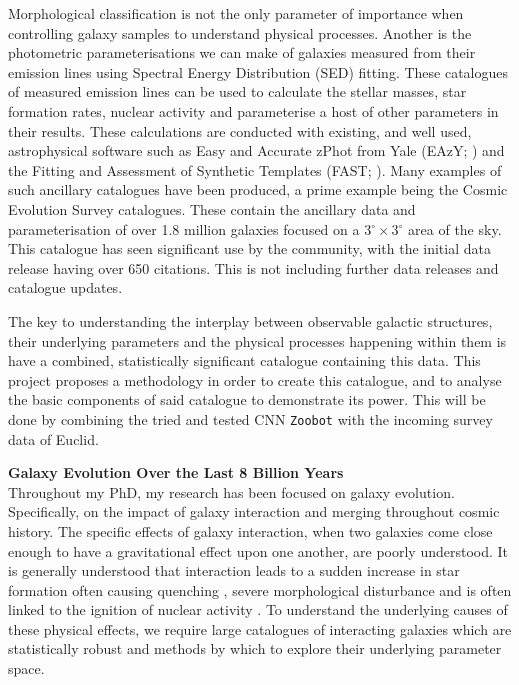 \documentclass[11pt,usenatbib]{article}
\begin{document}
Morphological classification is not the only parameter of importance when controlling galaxy samples to understand physical processes. Another is the photometric parameterisations we can make of galaxies measured from their emission lines using Spectral Energy Distribution (SED) fitting. These catalogues of measured emission lines can be used to calculate the stellar masses, star formation rates, nuclear activity and parameterise a host of other parameters in their results. These calculations are conducted with existing, and well used, astrophysical software such as Easy and Accurate zPhot from Yale (EAzY; \citet{Brammer et al. 2008}) and the Fitting and Assessment of Synthetic Templates (FAST; \citet{Kriek et al 2009}). Many examples of such ancillary catalogues have been produced, a prime example being the Cosmic Evolution Survey \citep[COSMOS; ][]{2007ApJS..172...99C} catalogues. These contain the ancillary data and parameterisation of over 1.8 million galaxies focused on a 3$^{\circ} \times $3$^{\circ}$ area of the sky. This catalogue has seen significant use by the community, with the initial data release having over 650 citations. This is not including further data releases and catalogue updates.

The key to understanding the interplay between observable galactic structures, their underlying parameters and the physical processes happening within them is have a combined, statistically significant catalogue containing this data. This project proposes a methodology in order to create this catalogue, and to analyse the basic components of said catalogue to demonstrate its power. This will be done by combining the tried and tested CNN \texttt{Zoobot} with the incoming survey data of Euclid.

\impact
\vspace{-3mm}
\noindent \textbf{Galaxy Evolution Over the Last 8 Billion Years} \\
\noindent Throughout my PhD, my research has been focused on galaxy evolution. Specifically, on the impact of galaxy interaction and merging throughout cosmic history. The specific effects of galaxy interaction, when two galaxies come close enough to have a gravitational effect upon one another, are poorly understood. It is generally understood that interaction leads to a sudden increase in star formation \citep{star bursts} often causing quenching \citep{quenching}, severe morphological disturbance \citep{disturbance} and is often linked to the ignition of nuclear activity \citep{nuclear activity}. To understand the underlying causes of these physical effects, we require large catalogues of interacting galaxies which are statistically robust and methods by which to explore their underlying parameter space. 
\end{document}
